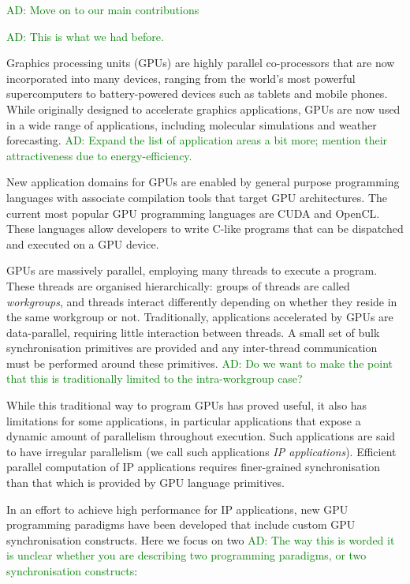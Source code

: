 \documentclass[nocopyrightspace]{sigplanconf-pldi16}
\newcommand{\ADComment}[1]{\textcolor{green}{AD: #1}}
\begin{document}
\ADComment{Move on to our main contributions}

\ADComment{This is what we had before.}

Graphics processing units (GPUs) are highly parallel co-processors that are now incorporated into many
devices, ranging from the world's most powerful supercomputers to battery-powered devices such as tablets and mobile phones. While
originally designed to accelerate graphics applications, GPUs are now
used in a wide range of applications, including molecular simulations
and weather forecasting. \ADComment{Expand the list of application areas a bit more; mention their attractiveness due to energy-efficiency.}

New application domains for GPUs are enabled by general purpose
programming languages with associate compilation tools that target GPU architectures.
The current most popular GPU programming languages are CUDA and OpenCL. These languages allow developers to
write C-like programs that can be dispatched and executed on a GPU
device.

GPUs are massively parallel, employing many threads to execute a
program.  These threads are organised hierarchically: groups of threads
are called \emph{workgroups}, and threads interact differently depending on whether they reside in the same workgroup or not.  Traditionally, applications accelerated by GPUs are
data-parallel, requiring little interaction between threads. A small
set of bulk synchronisation primitives are provided and any
inter-thread communication must be performed around these primitives.  \ADComment{Do we want to make the point that this is traditionally limited to the intra-workgroup case?}

While this traditional way to program GPUs has proved useful, it also
has limitations for some applications, in particular applications that
expose a dynamic amount of parallelism throughout execution. Such
applications are said to have irregular parallelism (we call such
applications \emph{IP applications}). Efficient parallel computation
of IP applications requires finer-grained synchronisation than that
which is provided by GPU language primitives.

In an effort to achieve high performance for IP applications, new GPU
programming paradigms have been developed that include custom GPU
synchronisation constructs. Here we focus on two \ADComment{The way this is worded it is unclear whether you are describing two programming paradigms, or two synchronisation constructs}:
\end{document}
